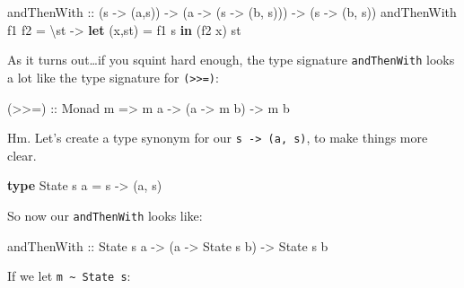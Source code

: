 \documentclass[]{article}
\newenvironment{Shaded}{}{}
\newcommand{\DataTypeTok}[1]{\textcolor[rgb]{0.56,0.13,0.00}{#1}}
\newcommand{\KeywordTok}[1]{\textcolor[rgb]{0.00,0.44,0.13}{\textbf{#1}}}
\newcommand{\NormalTok}[1]{#1}
\newcommand{\OtherTok}[1]{\textcolor[rgb]{0.00,0.44,0.13}{#1}}
\begin{document}
\begin{Shaded}
\begin{Highlighting}[]
\OtherTok{andThenWith ::}\NormalTok{ (s }\OtherTok{{-}>}\NormalTok{ (a,s)) }\OtherTok{{-}>}\NormalTok{ (a }\OtherTok{{-}>}\NormalTok{ (s }\OtherTok{{-}>}\NormalTok{ (b, s))) }\OtherTok{{-}>}\NormalTok{ (s }\OtherTok{{-}>}\NormalTok{ (b, s))}
\NormalTok{andThenWith f1 f2 }\OtherTok{=}\NormalTok{ \textbackslash{}st }\OtherTok{{-}>} \KeywordTok{let}\NormalTok{ (x,st\textquotesingle{}) }\OtherTok{=}\NormalTok{ f1 s}
                           \KeywordTok{in}\NormalTok{  (f2 x) st\textquotesingle{}}
\end{Highlighting}
\end{Shaded}

As it turns out\ldots if you squint hard enough, the type signature
\texttt{andThenWith} looks a lot like the type signature for
\texttt{(\textgreater{}\textgreater{}=)}:

\begin{Shaded}
\begin{Highlighting}[]
\OtherTok{(>>=) ::} \DataTypeTok{Monad}\NormalTok{ m }\OtherTok{=>}\NormalTok{ m a }\OtherTok{{-}>}\NormalTok{ (a }\OtherTok{{-}>}\NormalTok{ m b) }\OtherTok{{-}>}\NormalTok{ m b}
\end{Highlighting}
\end{Shaded}

Hm. Let's create a type synonym for our \texttt{s\ -\textgreater{}\ (a,\ s)}, to
make things more clear.

\begin{Shaded}
\begin{Highlighting}[]
\KeywordTok{type} \DataTypeTok{State}\NormalTok{ s a }\OtherTok{=}\NormalTok{ s }\OtherTok{{-}>}\NormalTok{ (a, s)}
\end{Highlighting}
\end{Shaded}

So now our \texttt{andThenWith} looks like:

\begin{Shaded}
\begin{Highlighting}[]
\OtherTok{andThenWith ::} \DataTypeTok{State}\NormalTok{ s a }\OtherTok{{-}>}\NormalTok{ (a }\OtherTok{{-}>} \DataTypeTok{State}\NormalTok{ s b) }\OtherTok{{-}>} \DataTypeTok{State}\NormalTok{ s b}
\end{Highlighting}
\end{Shaded}

If we let \texttt{m\ \textasciitilde{}\ State\ s}:
\end{document}
